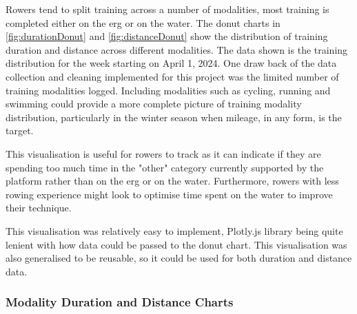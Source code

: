 Rowers tend to split training across a number of modalities, most training is completed either on the erg or on the water. The donut charts in \autoref{fig:durationDonut} and \autoref{fig:distanceDonut} show the distribution of training duration and distance across different modalities. The data shown is the training distribution for the week starting on April 1, 2024. One draw back of the data collection and cleaning implemented for this project was the limited number of training modalities logged. Including modalities such as cycling, running and swimming could provide a more complete picture of training modality distribution, particularly in the winter season when mileage, in any form, is the target.

This visualisation is useful for rowers to track as it can indicate if they are spending too much time in the "other" category currently supported by the platform rather than on the erg or on the water. Furthermore, rowers with less rowing experience might look to optimise time spent on the water to improve their technique.

This visualisation was relatively easy to implement, Plotly.js library being quite lenient with how data could be passed to the donut chart. This visualisation was also generalised to be reusable, so it could be used for both duration and distance data.

\subsubsection{Modality Duration and Distance Charts}

